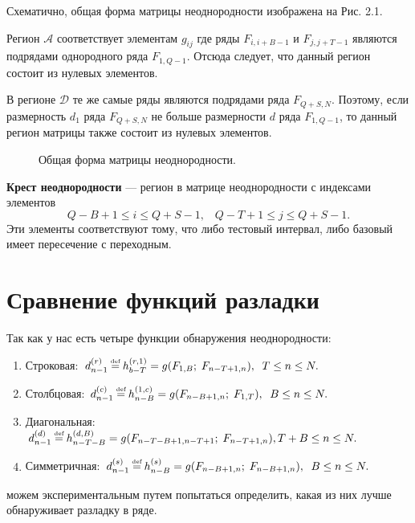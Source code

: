 \documentclass[specialist, substylefile = spbu.rtx,
			   subf, href, 12pt]{disser}
\newcommand\eqdef{\mathrel{\stackrel{\makebox[0pt]{\mbox{\normalfont\tiny def}}}{=}}}
\begin{document}
Схематично, общая форма матрицы неоднородности изображена на Рис. 2.1. 

Регион $ \mathcal{A} $ соответствует элементам $ g_{ij} $ где ряды $ F_{i, i+B-1} $ и $ F_{j, j+T-1} $ являются подрядами однородного ряда $ F_{1,Q-1} $. Отсюда следует, что данный регион состоит из нулевых элементов. 

В регионе $ \mathcal{D} $ те же самые ряды являются подрядами ряда $ F_{Q+S,N} $. Поэтому, если размерность $ d_1 $ ряда $ F_{Q+S, N} $ не больше размерности $ d $ ряда $ F_{1, Q-1} $, то данный регион матрицы также состоит из нулевых элементов.


\begin{figure}[h]
	\caption{Общая форма матрицы неоднородности.}
\end{figure}

\textbf{Крест неоднородности} --- регион в матрице неоднородности с индексами элементов
$$Q-B+1 \leq i \leq Q+S-1, \;\;\; Q-T+1 \leq j \leq Q+S-1.$$
Эти элементы соответствуют тому, что либо тестовый интервал, либо базовый имеет пересечение с переходным.

\newpage
\chapter{Сравнение функций разладки}

Так как у нас есть четыре функции обнаружения неоднородности:
\begin{enumerate}
	\item 
	Строковая: $d_{n-1}^{(r)} \eqdef h_{b-T}^{(r, 1)} = g(F_{1, B};\; F_{n-T+1, n}), \;\; T \leq n \leq N.$
	
	\item
	Столбцовая: $d_{n-1}^{(c)} \eqdef h_{n-B}^{(1, c)} = g(F_{n-B+1, n};\; F_{1, T}), \;\; B \leq n \leq N.$
	
	\item
	Диагональная: $d_{n-1}^{(d)} \eqdef h_{n-T-B}^{(d, B)} = g(F_{n-T-B+1, n-T+1};\; F_{n-T+1, n}), T + B \leq n \leq N.$
	
	\item
	Симметричная: $d_{n-1}^{(s)} \eqdef h_{n-B}^{(s)} = g(F_{n-B+1, n};\; F_{n-B+1, n}), \;\; B \leq n \leq N.$
	
\end{enumerate}
можем экспериментальным путем попытаться определить, какая из них лучше обнаруживает разладку в ряде.
\end{document}
